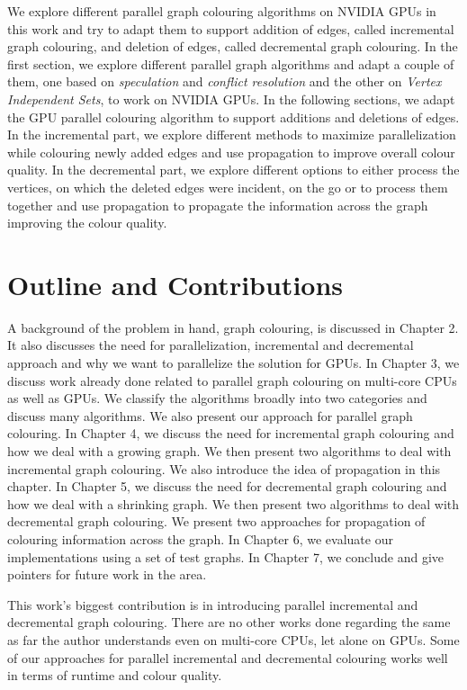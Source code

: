\documentclass[MTech]{iitmdiss}
\begin{document}
We explore different parallel graph colouring algorithms on NVIDIA GPUs in this work and try to adapt them to support addition of edges, called incremental graph colouring, and deletion of edges, called decremental graph colouring. In the first section, we explore different parallel graph algorithms and adapt a couple of them, one based on \textit{speculation} and \textit{conflict resolution} and the other on \textit{Vertex Independent Sets}, to work on NVIDIA GPUs. In the following sections, we adapt the GPU parallel colouring algorithm to support additions and deletions of edges. In the incremental part, we explore different methods to maximize parallelization while colouring newly added edges and use propagation to improve overall colour quality. In the decremental part, we explore different options to either process the vertices, on which the deleted edges were incident, on the go or to process them together and use propagation to propagate the information across the graph improving the colour quality. 

\section{Outline and Contributions}
A background of the problem in hand, graph colouring, is discussed in Chapter 2. It also discusses the need for parallelization, incremental and decremental approach and why we want to parallelize the solution for GPUs. In Chapter 3, we discuss work already done related to parallel graph colouring on multi-core CPUs as well as GPUs. We classify the algorithms broadly into two categories and discuss many algorithms. We also present our approach for parallel graph colouring. In Chapter 4, we discuss the need for incremental graph colouring and how we deal with a growing graph. We then present two algorithms to deal with incremental graph colouring. We also introduce the idea of propagation in this chapter. In Chapter 5, we discuss the need for decremental graph colouring and how we deal with a shrinking graph. We then present two algorithms to deal with decremental graph colouring. We present two approaches for propagation of colouring information across the graph. In Chapter 6, we evaluate our implementations using a set of test graphs. In Chapter 7, we conclude and give pointers for future work in the area.

This work's biggest contribution is in introducing parallel incremental and decremental graph colouring. There are no other works done regarding the same as far the author understands even on multi-core CPUs, let alone on GPUs. Some of our approaches for parallel incremental and decremental colouring works well in terms of runtime and colour quality.
\end{document}
